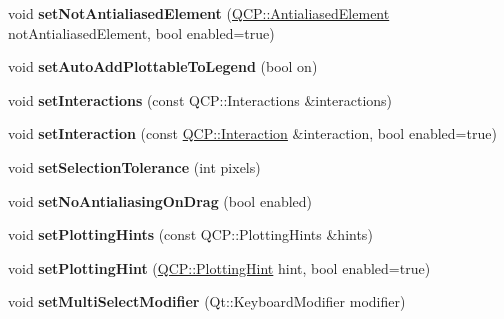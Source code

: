 \begin{DoxyCompactItemize}
\mbox{\label{class_q_custom_plot_afc657938a707c890e449ae89203a076d}} 
void {\bfseries set\+Not\+Antialiased\+Element} (\hyperlink{namespace_q_c_p_ae55dbe315d41fe80f29ba88100843a0c}{Q\+C\+P\+::\+Antialiased\+Element} not\+Antialiased\+Element, bool enabled=true)
\item 
\mbox{\label{class_q_custom_plot_ad8858410c2db47b7104040a3aa61c3fc}} 
void {\bfseries set\+Auto\+Add\+Plottable\+To\+Legend} (bool on)
\item 
\mbox{\label{class_q_custom_plot_a5ee1e2f6ae27419deca53e75907c27e5}} 
void {\bfseries set\+Interactions} (const Q\+C\+P\+::\+Interactions \&interactions)
\item 
\mbox{\label{class_q_custom_plot_a422bf1bc6d56dac75a3d805d9a65902c}} 
void {\bfseries set\+Interaction} (const \hyperlink{namespace_q_c_p_a2ad6bb6281c7c2d593d4277b44c2b037}{Q\+C\+P\+::\+Interaction} \&interaction, bool enabled=true)
\item 
\mbox{\label{class_q_custom_plot_a4dc31241d7b09680950e19e5f971ed93}} 
void {\bfseries set\+Selection\+Tolerance} (int pixels)
\item 
\mbox{\label{class_q_custom_plot_a775bdcb6329d44701aeaa6135b0e5265}} 
void {\bfseries set\+No\+Antialiasing\+On\+Drag} (bool enabled)
\item 
\mbox{\label{class_q_custom_plot_a94a33cbdadbbac5934843508bcfc210d}} 
void {\bfseries set\+Plotting\+Hints} (const Q\+C\+P\+::\+Plotting\+Hints \&hints)
\item 
\mbox{\label{class_q_custom_plot_a3b7c97bb6c16464e9e15190c07abe9a9}} 
void {\bfseries set\+Plotting\+Hint} (\hyperlink{namespace_q_c_p_a5400e5fcb9528d92002ddb938c1f4ef4}{Q\+C\+P\+::\+Plotting\+Hint} hint, bool enabled=true)
\item 
\mbox{\label{class_q_custom_plot_a8fc96e3b5138a06759a2a90c166df516}} 
void {\bfseries set\+Multi\+Select\+Modifier} (Qt\+::\+Keyboard\+Modifier modifier)
\item 

\end{DoxyCompactItemize}
